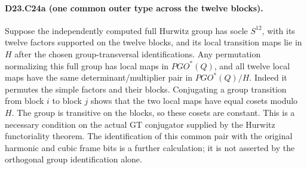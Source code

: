 \paragraph{D23.C24a (one common outer type across the twelve blocks).}
Suppose the independently computed full Hurwitz group has
socle $S^{12}$, with its twelve factors supported on the
twelve blocks, and its local transition maps lie in $H$
after the chosen group-transversal identifications.
Any permutation normalizing this full group has local maps
in $PGO^*(Q)$, and all twelve local maps have the same
determinant/multiplier pair in $PGO^*(Q)/H$.
Indeed it permutes the simple factors and their blocks.
Conjugating a group transition from block $i$ to block $j$
shows that the two local maps have equal cosets modulo $H$.
The group is transitive on the blocks, so these cosets are
constant. This is a necessary condition on the actual GT
conjugator supplied by the Hurwitz functoriality theorem.
The identification of this common pair with the original
harmonic and cubic frame bits is a further calculation;
it is not asserted by the orthogonal group identification alone.
